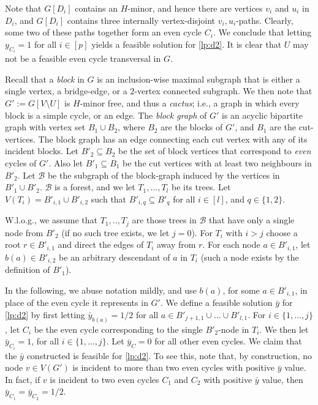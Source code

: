 \documentclass{article}
\newcommand{\B}{\mathcal{B}}
\newcommand{\0}{\mathbb{0}}
\newcommand{\1}{\mathbb{1}}
\begin{document}
Note that $G[D_i]$ contains an $H$-minor, and hence there are vertices
$v_i$ and $u_i$ in $D_i$, and $G[D_i]$ contains three internally
vertex-disjoint $v_i, u_i$-paths. Clearly, some two of these paths
together form an even cycle $C_i$. We conclude that letting
$y_{C_i}=1$ for all $i \in [p]$ yields a feasible solution for
\eqref{lp:d2}. It is clear that $U$ may not be a feasible even cycle
transversal in $G$. 

Recall that a {\em block} in $G$ is an inclusion-wise maximal subgraph
that is either a single vertex, a bridge-edge, or a $2$-vertex
connected subgraph. We then note that $G':=G[V\setminus U]$ is
$H$-minor free, and thus a {\em cactus}; i.e., a graph in which every
block is a simple cycle, or an edge. The {\em block graph} of $G'$ is
an acyclic bipartite graph with vertex set $B_1 \cup B_2$, where $B_2$
are the blocks of $G'$, and $B_1$ are the cut-vertices. The block
graph has an edge connecting each cut vertex with any of its incident
blocks.
Let $B'_2 \subseteq B_2$ be the set of block vertices
that correspond to {\em even} cycles of $G'$. Also let $B'_1 \subseteq B_1$ be
the cut vertices with at least two neighbours in $B'_2$.  Let $\B$ be
the subgraph of the block-graph induced by the vertices in
$B'_1 \cup B'_2$. $\B$ is a forest, and we let $T_1, \ldots, T_l$ be
its trees. Let $V(T_i)=B'_{i,1} \cup B'_{i,2}$ such that $B'_{i,q}
\subseteq B'_q$ for all $i \in [l]$, and $q \in \{1,2\}$. 

W.l.o.g., we assume that $T_1,.., T_j$ are those trees in $\B$ that
have only a single node from $B'_2$ (if no such tree exists, we let $j=0$). 
For $T_i$ with $i>j$ choose a root $r \in B'_{i,1}$
and direct the edges of $T_i$ away from $r$. For each node
$a \in B'_{i,1}$, let $b(a) \in B'_{i,2}$ be an arbitrary descendant
of $a$ in $T_i$ (such a node exists by the definition of $B'_1$). 

In the following, we abuse notation mildly, and use $b(a)$, for some
$a \in B'_{i,1}$, in place of the even cycle it represents in $G'$.
We define a feasible solution $\bar{y}$ for \eqref{lp:d2} by first letting
$\bar{y}_{b(a)}=1/2$ for all $a \in B'_{j+1,1} \cup \ldots \cup B'_{l,1}$.
For $i \in \{1, \ldots, j\}$, let $C_i$ be the even cycle
corresponding to the single $B'_2$-node in $T_i$. We then let
$\bar{y}_{C_i}=1$, for all $i \in \{1, \ldots, j\}$. 
Let $\bar{y}_C=0$ for  all other even cycles. We claim that the $\bar{y}$
constructed is feasible for \eqref{lp:d2}. 
To see this, note that, by construction, no node $v \in V(G')$ is
incident to more than two even cycles with positive $\bar{y}$ value. 
In fact, if $v$ is incident to two even cycles $C_1$ and $C_2$ with
positive $\bar{y}$ value, then $\bar{y}_{C_1}=\bar{y}_{C_2}=1/2$. 
\end{document}
